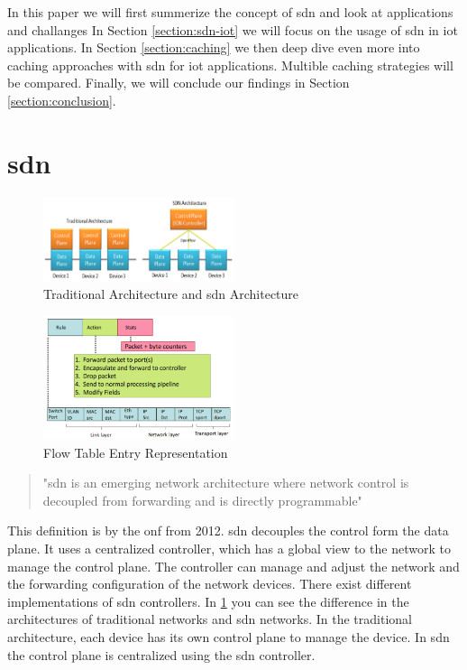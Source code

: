 \documentclass[conference]{IEEEtran}
\begin{document}
	In this paper we will first summerize the concept of \ac{sdn} and look at applications and challanges In Section \ref{section:sdn-iot} we will focus on the usage of \ac{sdn} in \ac{iot} applications. In Section \ref{section:caching} we then deep dive even more into caching approaches with \ac{sdn} for \ac{iot} applications. Multible caching strategies will be compared. Finally, we will conclude our findings in Section \ref{section:conclusion}. 

	\section{\ac{sdn}}
	\label{section:sdn}

	\begin{figure}
		\label{fig:architecture-compare}
		\centering
		\includegraphics[width=0.5\textwidth]{figures/architecture-compare.png}
		\caption{Traditional Architecture and \ac{sdn} Architecture \cite{Jefia2018-pj}}
	\end{figure}

	\begin{figure}
		\label{fig:flow-table}
		\centering
		\includegraphics[width=0.5\textwidth]{figures/flow-table.png}
		\caption{Flow Table Entry Representation \cite{nunez2023briefoverviewsoftwaredefinednetworking}}
	\end{figure}

	\begin{quote}
		"\acf{sdn} is an emerging network architecture
		where network control is decoupled from forwarding and is directly programmable" \cite{sdn-onf} 
	\end{quote}

	This definition is by the \ac{onf} from 2012. \acf{sdn} decouples the control form the data plane. It uses a centralized controller, which has a global view to the network to manage the control plane. The controller can manage and adjust the network and the forwarding configuration of the network devices. There exist different implementations of \ac{sdn} controllers. In \ref{fig:architecture-compare} you can see the difference in the architectures of traditional networks and \ac{sdn} networks. In the traditional architecture, each device has its own control plane to manage the device. In \ac{sdn} the control plane is centralized using the \ac{sdn} controller.
\end{document}
